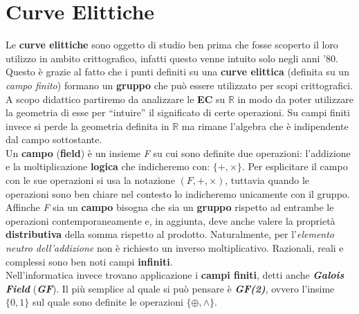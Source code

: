 \chapter{Curve Elittiche}
Le \textbf{curve elittiche} sono oggetto di studio ben prima che fosse scoperto il loro utilizzo in ambito crittografico, infatti questo venne intuito solo negli anni '80. Questo è grazie al fatto che i punti definiti su una \textbf{curve elittica} (definita su un \textit{campo finito}) formano un \textbf{gruppo} che può essere utilizzato per scopi crittografici. \\
A scopo didattico partiremo da analizzare le \textbf{EC} su $\mathbb{R}$ in modo da poter utilizzare la geometria di esse per ``intuire'' il significato di certe operazioni. Su campi finiti invece si perde la geometria definita in $\mathbb{R}$ ma rimane l'algebra che è indipendente dal campo sottostante.
\\ \newline
Un \textbf{campo} (\textbf{field}) è un insieme \textit{F} su cui sono definite due operazioni: l'addizione e la moltiplicazione \textbf{logica} che indicheremo con: $\{+, \times\}$. Per esplicitare il campo con le sue operazioni si usa la notazione $(F, +, \times)$, tuttavia quando le operazioni sono ben chiare nel contesto lo indicheremo unicamente con il gruppo. Affinche \textit{F} sia un \textbf{campo} bisogna che sia un \textbf{gruppo} rispetto ad entrambe le operazioni contemporaneamente e, in aggiunta, deve anche valere la proprietà \textbf{distributiva} della somma rispetto al prodotto. Naturalmente, per l'\textit{elemento neutro dell'addizione} non è richiesto un inverso moltiplicativo. Razionali, reali e complessi sono ben noti campi \textbf{infiniti}. \\ 
Nell'informatica invece trovano applicazione i \textbf{campi finiti}, detti anche \textbf{\textit{Galois Field}} (\textbf{\textit{GF}}). Il più semplice al quale si può pensare è \textbf{\textit{GF(2)}}, ovvero l'insime $\{0, 1\}$ sul quale sono definite le operazioni $\{\oplus, \land \}$.

